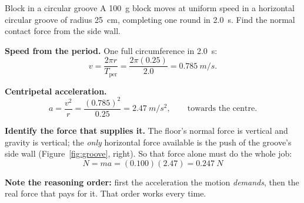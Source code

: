 \begin{exbox}{Block in a circular groove}
A \SI{100}{g} block moves at uniform speed in a horizontal circular groove of radius \SI{25}{cm},
completing one round in \SI{2.0}{s}. Find the normal contact force from the side wall.

 \textbf{Speed from the period.} One full circumference in \SI{2.0}{s}:
\[
v=\frac{2\pi r}{T_{\text{per}}}=\frac{2\pi(0.25)}{2.0}=\SI{0.785}{m/s}.
\]

 \textbf{Centripetal acceleration.}
\[
a=\frac{v^{2}}{r}=\frac{(0.785)^{2}}{0.25}=\SI{2.47}{m/s^2},\qquad\text{towards the centre.}
\]

 \textbf{Identify the force that supplies it.} The floor's normal force is vertical and
gravity is vertical; the \emph{only} horizontal force available is the push of the groove's side wall
(Figure~\ref{fig:groove}, right).
So that force alone must do the whole job:
\[
N=ma=(0.100)(2.47)=\boxed{\SI{0.247}{N}}
\]

\smallskip
\textbf{Note the reasoning order:} first the acceleration the motion \emph{demands}, then the real
force that pays for it. That order works every time.
\end{exbox}

\begin{figure}[htbp]
\centering
{}
\end{figure}

